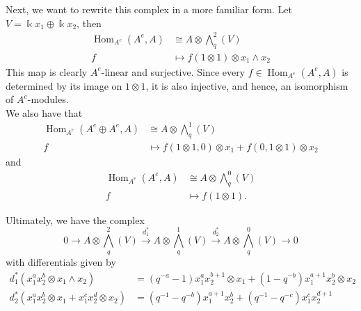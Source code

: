 \documentclass[12pt,a4paper]{article}
\DeclareMathOperator{\Hom}{Hom}
\newcommand{\Wedge}{\textstyle\bigwedge}
\newcommand{\kk}{\Bbbk}
\newcommand\1{_{(1)}}
\newcommand\2{_{(2)}}
\begin{document}
Next, we want to rewrite this complex in a more familiar form.
Let $V=\kk x_1\oplus \kk x_2$, then
\begin{align*}
\Hom_{A^e}(A^e,A)&\cong A\otimes \Wedge^2_q (V)\\
f&\mapsto f(1\otimes 1)\otimes x_1\wedge x_2
\end{align*}
This map is clearly $A^e$-linear and surjective.
Since every $f\in \Hom_{A^e}(A^e,A)$ is determined by its image on $1\otimes 1$, it is also injective, and hence, an isomorphism of $A^e$-modules.
\\

We also have that
\begin{align*}
\Hom_{A^e}(A^e\oplus A^e,A)&\cong A\otimes \Wedge_q^1(V)\\
f&\mapsto f(1\otimes 1,0)\otimes x_1+f(0,1\otimes 1)\otimes x_2
\end{align*}
and
\begin{align*}
\Hom_{A^e}(A^e,A)&\cong A\otimes \Wedge_q^0 (V)\\
f&\mapsto f(1\otimes 1).
\end{align*}

Ultimately, we have the complex
\[
0 \to A\otimes \Wedge_q^2(V)\xrightarrow{d_1^*}A\otimes \Wedge_q^1(V)\xrightarrow{d_2^*}A\otimes \Wedge_q^0(V)\to 0
\]
with differentials given by
\begin{align*}
d_1^*(x_1^ax_2^b\otimes x_1\wedge x_2)&=(q^{-a}-1)x_1^ax_2^{b+1}\otimes x_1+(1-q^{-b})x_1^{a+1}x_2^b\otimes x_2\\
d_2^*(x_1^ax_2^b\otimes x_1+x_1^cx_2^d\otimes x_2)&=(q^{-1}-q^{-b})x_1^{a+1}x_2^b+(q^{-1}-q^{-c})x_1^cx_2^{d+1}
\end{align*}
\end{document}

